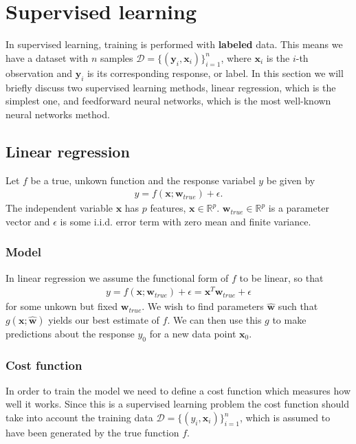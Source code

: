 \documentclass[twoside,english]{uiofysmaster}
\begin{document}
\section{Supervised learning}
In supervised learning, training is performed with \textbf{labeled} data. This means we have a dataset with $n$ samples $\mathcal{D} = \{ (\bm{y}_i, \bm{x}_i) \}_{i=1}^n$, where $\bm{x}_i$ is the $i$-th observation and $\bm{y}_i$ is its corresponding response, or label. In this section we will briefly discuss two supervised learning methods, linear regression, which is the simplest one, and feedforward neural networks, which is the most well-known neural networks method. 


\subsection{Linear regression}
Let $f$ be a true, unkown function and the response variabel $y$ be given by
\begin{align}
	y = f(\bm{x}; \bm{w}_{true}) + \epsilon.
\end{align} 
The independent variable $\bm{x}$ has $p$ features, $\bm{x} \in \mathbb{R}^p$. $\bm{w}_{true} \in \mathbb{R}^p$ is a parameter vector and $\epsilon$ is some i.i.d. error term with zero mean and finite variance.

\subsubsection{Model}
In linear regression we assume the functional form of $f$ to be linear, so that
\begin{align}
	y = f(\bm{x}; \bm{w}_{true}) + \epsilon = \bm{x}^T \bm{w}_{true} + \epsilon
\end{align}
for some unkown but fixed $\bm{w}_{true}$. We wish to find parameters $\hat{\bm{w}}$ such that $g(\bm{x}; \hat{\bm{w}})$ yields our best estimate of $f$. We can then use this $g$ to make predictions about the response $y_0$ for a new data point $\bm{x}_0$. 

\subsubsection{Cost function}
In order to train the model we need to define a cost function which measures how well it works. Since this is a supervised learning problem the cost function should take into account the training data $\mathcal{D}= \{ (y_i, \bm{x}_i) \}_{i=1}^n$, which is assumed to have been generated by the true function $f$. 
\end{document}
